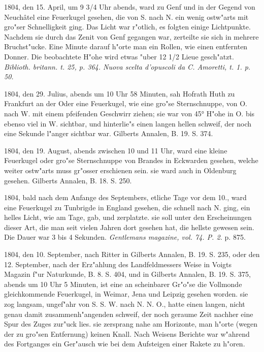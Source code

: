 \documentclass[a4paper, 11pt, oneside, polutonikogreek, german]{article}
\begin{document}
1804, den 15. April, um 9 3/4 Uhr abends, ward zu Genf und in der Gegend von Neuchâtel eine Feuerkugel gesehen, die von S. nach N. ein wenig ostw"arts mit gro"ser Schnelligkeit ging. Das Licht war r"otlich, es folgten einige Lichtpunkte. Nachdem sie durch das Zenit von Genf gegangen war, zerteilte sie sich in mehrere Bruchst"ucke. Eine Minute darauf h"orte man ein Rollen, wie einen entfernten Donner. Die beobachtete H"ohe wird etwas "uber 12 1/2 Lieue gesch"atzt. \emph{Biblioth. britann. t. 25, p. 364. Nuova scelta d'opuscoli da C. Amoretti, t. 1. p. 50.}

1804, den 29. Julius, abends um 10 Uhr 58 Minuten, sah Hofrath Huth zu Frankfurt an der Oder eine Feuerkugel, wie eine gro"se Sternschnuppe, von O. nach W. mit einem pfeifenden Geschwirr ziehen; sie war von 45° H"ohe in O. bis ebenso viel in W. sichtbar, und hinterlie"s einen langen hellen schweif, der noch eine Sekunde l"anger sichtbar war. Gilberts Annalen, B. 19. S. 374.

1804, den 19. August, abends zwischen 10 und 11 Uhr, ward eine kleine Feuerkugel oder gro"se Sternschnuppe von Brandes in Eckwarden gesehen, welche weiter ostw"arts muss gr"osser erschienen sein. sie ward auch in Oldenburg gesehen. Gilberts Annalen, B. 18. S. 250.

1804, bald nach dem Anfange des Septembers, etliche Tage vor dem 10., ward eine Feuerkugel zu Tunbrigde in England gesehen, die schnell nach N. ging, ein helles Licht, wie am Tage, gab, und zerplatzte. sie soll unter den Erscheinungen dieser Art, die man seit vielen Jahren dort gesehen hat, die hellste gewesen sein. Die Dauer war 3 bis 4 Sekunden. \emph{Gentlemans magazine, vol. 74. P. 2.} p. 875.

1804, den 10. September, nach Ritter in Gilberts Annalen, B. 19. S. 235, oder den 12. September, nach der Erz"ahlung des Landfeldmessers Weise in Voigts Magazin f"ur Naturkunde, B. 8. S. 404, und in Gilberts Annalen, B. 19. S. 375, abends um 10 Uhr 5 Minuten, ist eine an scheinbarer Gr"o"se die Vollmonde gleichkommende Feuerkugel, in Weimar, Jena und Leipzig gesehen worden. sie zog langsam, ungef"ahr von S. S. W. nach N. N. O., hatte einen langen, nicht genau damit zusammenh"angenden schweif, der noch geraume Zeit nachher eine Spur des Zuges zur"uck lies. sie zersprang nahe am Horizonte, man h"orte (wegen der zu gro"sen Entfernung) keinen Knall. Nach Weisens Berichte war w"ahrend des Fortganges ein Ger"ausch wie bei dem Aufsteigen einer Rakete zu h"oren.
\end{document}
